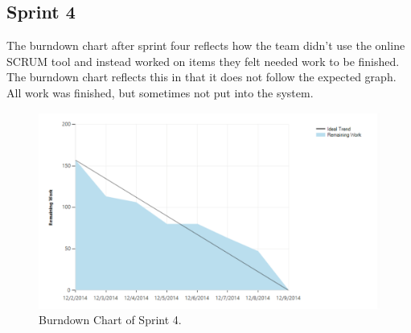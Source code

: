 \subsection{Sprint 4}
The burndown chart after sprint four reflects how the team didn't use the online SCRUM tool and instead worked on items they felt needed work to be finished. The burndown chart reflects this in that it does not follow the expected graph. All work was finished, but sometimes not put into the system. \\

\begin{figure}[H]
	\centering
	\includegraphics[scale=0.40]{Figures/Burndown3}
	\caption{Burndown Chart of Sprint 4.}
\end{figure}
